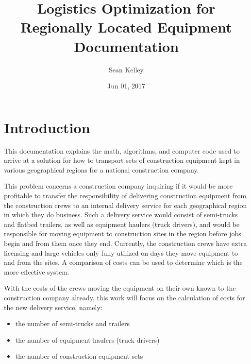 \documentclass[letterpaper,10pt,english]{sphinxmanual}
\title{Logistics Optimization for Regionally Located Equipment Documentation}
\date{Jun 01, 2017}
\author{Sean Kelley}
\begin{document}
\maketitle
\sphinxtableofcontents
{}\label{\detokenize{index::doc}}



\chapter{Introduction}
\label{\detokenize{introduction:introduction}}\label{\detokenize{introduction::doc}}\label{\detokenize{introduction:contents}}\label{\detokenize{introduction:id1}}
This documentation explains the math, algorithms, and computer code used to
arrive at a solution for how to transport sets of construction equipment kept
in various geographical regions for a national construction company.

This problem concerns a construction company inquiring if it would be more
profitable to transfer the responsibility of delivering construction
equipment from the construction crews to an internal delivery service for
each geographical region in which they do business. Such a delivery service
would consist of semi-trucks and flatbed trailers, as well as equipment
haulers (truck drivers), and would be responsible for moving equipment to
construction sites in the region before jobs begin and from them once
they end. Currently, the construction crews have extra licensing and large
vehicles only fully utilized on days they move equipment to and from the
sites. A comparison of costs can be used to determine which is the more
effective system.

With the costs of the crews moving the equipment on their own known to the
construction company already, this work will focus on the calculation of
costs for the new delivery service, namely:
\begin{itemize}
\item {} 
the number of semi-trucks and trailers

\item {} 
the number of equipment haulers (truck drivers)

\item {} 
the number of construction equipment sets

\end{itemize}
\end{document}
